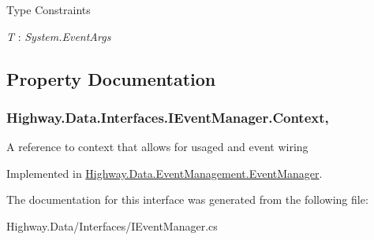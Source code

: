 \begin{Desc}
\item[Type Constraints]\begin{description}
\item[{\em T} : {\em System.\-Event\-Args}]\end{description}
\end{Desc}


\subsection{Property Documentation}
\hypertarget{interface_highway_1_1_data_1_1_interfaces_1_1_i_event_manager_aae163759719833dca07513b02efbafa8}{
\subsubsection[{Context}]{ Highway.\-Data.\-Interfaces.\-I\-Event\-Manager.\-Context\hspace{0.3cm}{\ttfamily [get]}, {\ttfamily [set]}}}\label{interface_highway_1_1_data_1_1_interfaces_1_1_i_event_manager_aae163759719833dca07513b02efbafa8}


A reference to context that allows for usaged and event wiring 



Implemented in \hyperlink{class_highway_1_1_data_1_1_event_management_1_1_event_manager_ac5a9cddf17fcb4c3b298b3d50431de2f}{Highway.\-Data.\-Event\-Management.\-Event\-Manager}.



The documentation for this interface was generated from the following file\-:\begin{DoxyCompactItemize}
\item 
Highway.\-Data/\-Interfaces/I\-Event\-Manager.\-cs\end{DoxyCompactItemize}
